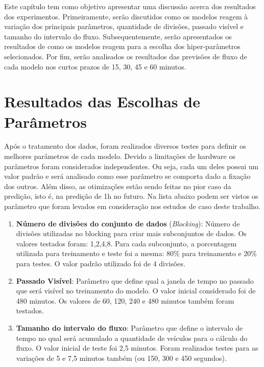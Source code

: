 

Este capítulo tem como objetivo apresentar uma discussão acerca dos resultados dos experimentos. Primeiramente, serão discutidos como os modelos reagem à variação dos principais parâmetros, quantidade de divisões, passado visível e tamanho do intervalo do fluxo. Subsequentemente, serão apresentados os resultados de como os modelos reagem para a escolha dos hiper-parâmetros selecionados. Por fim, serão analisados os resultados das previsões de fluxo de cada modelo nos curtos prazos de 15, 30, 45 e 60 minutos.

\section{Resultados das Escolhas de Parâmetros}

Após o tratamento dos dados, foram realizados diversos testes para definir os melhores parâmetros de cada modelo. Devido a limitações de hardware os parâmetros foram considerados independentes. Ou seja, cada um deles possui um valor padrão e será analisado como esse parâmetro se comporta dado a fixação dos outros. Além disso, as otimizações estão sendo feitas no pior caso da predição, isto é, na predição de 1h no futuro. Na lista abaixo podem ser vistos os parâmetro que foram levados em consideração nos estudos de caso deste trabalho.

\begin{enumerate}
	\item \textbf{Número de divisões do conjunto de dados} (\textit{Blocking}): Número de divisões utilizadas no blocking para criar mais subconjuntos de dados. Os valores testados foram: 1,2,4,8. Para cada subconjunto, a porcentagem utilizada para treinamento e teste foi a mesma: 80\% para treinamento e 20\% para testes. O valor padrão utilizado foi de 4 divisões.
	\item \textbf{Passado Visível}: Parâmetro que define qual a janela de tempo no passado que será visível no treinamento do modelo. O valor inicial considerado foi de 480 minutos. Os valores de 60, 120, 240 e 480 minutos também foram testados.
	\item \textbf{Tamanho do intervalo do fluxo}: Parâmetro que define o intervalo de tempo no qual será acumulado a quantidade de veículos para o cálculo do fluxo. O valor inicial de teste foi 2,5 minutos. Foram realizados testes para as variações de 5 e 7,5 minutos também (ou 150, 300 e 450 segundos).
\end{enumerate}

